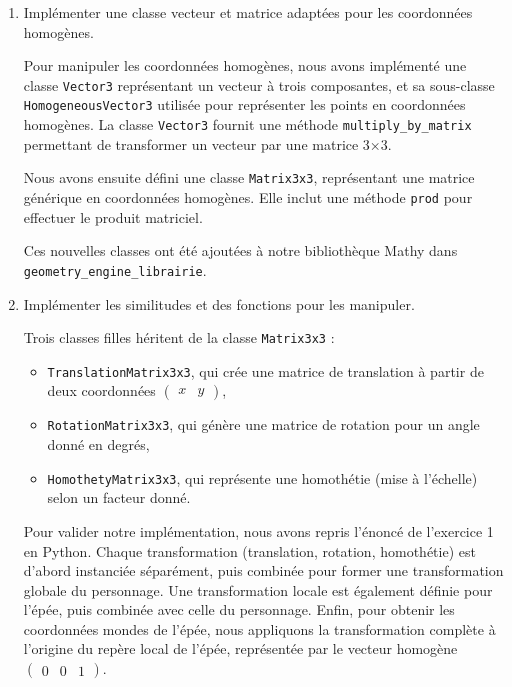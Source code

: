 \documentclass[a4paper,12pt]{article}
\begin{document}
\newpage

\label{exo:impl}
\begin{enumerate}
  \item Implémenter une classe vecteur et matrice adaptées pour les coordonnées homogènes.

Pour manipuler les coordonnées homogènes, nous avons implémenté une classe \texttt{Vector3} représentant un vecteur à trois
composantes, et sa sous-classe \texttt{HomogeneousVector3} utilisée pour représenter les points en coordonnées homogènes. La classe \texttt{Vector3} fournit une méthode \texttt{multiply\_by\_matrix} permettant de transformer un vecteur par une matrice 3×3.

Nous avons ensuite défini une classe \texttt{Matrix3x3}, représentant une matrice générique en coordonnées homogènes. Elle inclut une méthode \texttt{prod} pour effectuer le produit matriciel. 

Ces nouvelles classes ont été ajoutées à notre bibliothèque Mathy dans \texttt{geometry\_engine\_librairie}.

  \item Implémenter les similitudes et des fonctions pour les manipuler.

Trois classes filles héritent de la classe \texttt{Matrix3x3} :
\begin{itemize}
\item \texttt{TranslationMatrix3x3}, qui crée une matrice de translation à partir de deux coordonnées $\begin{pmatrix} x & y \end{pmatrix}$,
\item \texttt{RotationMatrix3x3}, qui génère une matrice de rotation pour un angle donné en degrés,
\item \texttt{HomothetyMatrix3x3}, qui représente une homothétie (mise à l’échelle) selon un facteur donné.
\end{itemize}

Pour valider notre implémentation, nous avons repris l’énoncé de l’exercice 1 en Python. Chaque transformation (translation, rotation, homothétie) est d’abord instanciée séparément, puis combinée pour former une transformation globale du personnage. Une transformation locale est également définie pour l’épée, puis combinée avec celle du personnage. Enfin, pour obtenir les coordonnées mondes de l’épée, nous appliquons la transformation complète à l’origine du repère local de l’épée, représentée par le vecteur homogène $\begin{pmatrix} 0 & 0 & 1 \end{pmatrix}$.
\end{enumerate}
\end{document}
